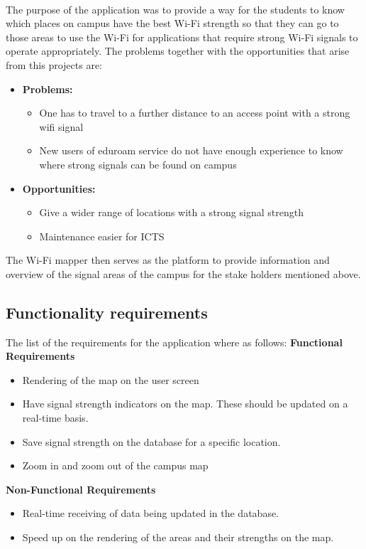 \paragraph{} 
The purpose of the application was to provide a way for the students to know which places on campus have the best Wi-Fi strength so that they can go to those areas to use the Wi-Fi for applications that require strong Wi-Fi signals to operate appropriately. The problems together with the opportunities that arise from this projects are:
\begin{itemize}
	\item \textbf{Problems:}
	\begin{itemize}
		\item One has to travel to a further distance to an access point with a strong wifi signal
		\item New users of eduroam service do not have enough experience to know where strong
		signals can be found on campus
	\end{itemize}
	\item  \textbf{Opportunities:}
	\begin{itemize}
		\item  Give a wider range of locations with a strong signal strength
		\item Maintenance easier for ICTS
	\end{itemize}
\end{itemize} 
The Wi-Fi mapper then serves as the platform to provide information and overview of the signal areas of the campus for the stake holders mentioned above.

\subsection*{Functionality requirements}
The list of the requirements for the application where as follows:
\newline\textbf{Functional Requirements}
\begin{itemize}
	\item Rendering of the map on the user screen
	\item Have signal strength indicators on the map. These should be updated on a real-time basis.
	\item Save signal strength on the database for a specific location.
	\item Zoom in and zoom out of the campus map
\end{itemize}
\textbf{Non-Functional Requirements}
\begin{itemize}
	\item Real-time receiving of data being updated in the database.
	\item Speed up on the rendering of the areas and their strengths on the map.
\end{itemize}
